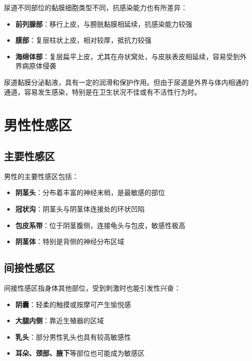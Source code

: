 尿道不同部位的黏膜细胞类型不同，抗感染能力也有所差异：

\begin{itemize}
    \item \textbf{前列腺部}：移行上皮，与膀胱黏膜相延续，抗感染能力较强
    \item \textbf{膜部}：复层柱状上皮，相对较厚，抵抗力较强
    \item \textbf{海绵体部}：复层扁平上皮，尤其在舟状窝处，与皮肤表皮相延续，容易受到外界病原体侵袭
\end{itemize}

尿道黏膜分泌黏液，具有一定的润滑和保护作用。但由于尿道是外界与体内相通的通道，容易发生感染，特别是在卫生状况不佳或有不洁性行为时。

\section{男性性感区}
\subsection{主要性感区}

男性的主要性感区包括：

\begin{itemize}
    \item \textbf{阴茎头}：分布着丰富的神经末梢，是最敏感的部位
    \item \textbf{冠状沟}：阴茎头与阴茎体连接处的环状凹陷
    \item \textbf{包皮系带}：位于阴茎腹侧，连接龟头与包皮，敏感性极高
    \item \textbf{阴茎体}：特别是背侧的神经分布区域
\end{itemize}

\subsection{间接性感区}

间接性感区指身体其他部位，受到刺激时也能引发性兴奋：

\begin{itemize}
    \item \textbf{阴囊}：轻柔的触摸或按摩可产生愉悦感
    \item \textbf{大腿内侧}：靠近生殖器的区域
    \item \textbf{乳头}：部分男性乳头也具有较高敏感性
    \item \textbf{耳朵、颈部、腋下}等部位也可能成为敏感区
\end{itemize}

